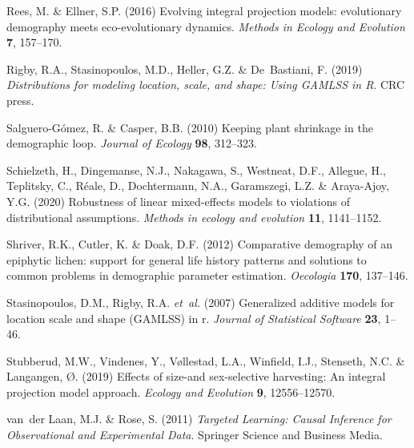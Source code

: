 \documentclass[12pt]{article}
\begin{document}
\begin{spacing}{1.9}
\begin{thebibliography}{62}
Rees, M. \& Ellner, S.P. (2016) Evolving integral projection models:
  evolutionary demography meets eco-evolutionary dynamics. \emph{Methods in
  Ecology and Evolution} \textbf{7}, 157--170.

Rigby, R.A., Stasinopoulos, M.D., Heller, G.Z. \& De~Bastiani, F. (2019)
  \emph{Distributions for modeling location, scale, and shape: Using GAMLSS in
  R}. CRC press.

Salguero-G{\'o}mez, R. \& Casper, B.B. (2010) Keeping plant shrinkage in the
  demographic loop. \emph{Journal of Ecology} \textbf{98}, 312--323.

Schielzeth, H., Dingemanse, N.J., Nakagawa, S., Westneat, D.F., Allegue, H.,
  Teplitsky, C., R{\'e}ale, D., Dochtermann, N.A., Garamszegi, L.Z. \&
  Araya-Ajoy, Y.G. (2020) Robustness of linear mixed-effects models to
  violations of distributional assumptions. \emph{Methods in ecology and
  evolution} \textbf{11}, 1141--1152.

Shriver, R.K., Cutler, K. \& Doak, D.F. (2012) Comparative demography of an
  epiphytic lichen: support for general life history patterns and solutions to
  common problems in demographic parameter estimation. \emph{Oecologia}
  \textbf{170}, 137--146.

Stasinopoulos, D.M., Rigby, R.A. \emph{et~al.} (2007) Generalized additive
  models for location scale and shape ({GAMLSS}) in r. \emph{Journal of
  Statistical Software} \textbf{23}, 1--46.

Stubberud, M.W., Vindenes, Y., V{\o}llestad, L.A., Winfield, I.J., Stenseth,
  N.C. \& Langangen, {\O}. (2019) Effects of size-and sex-selective harvesting:
  An integral projection model approach. \emph{Ecology and Evolution}
  \textbf{9}, 12556--12570.

van~der Laan, M.J. \& Rose, S. (2011) \emph{Targeted Learning: Causal Inference
  for Observational and Experimental Data}. Springer Science and Business
  Media.


\end{thebibliography}
\end{spacing}
\end{document}
